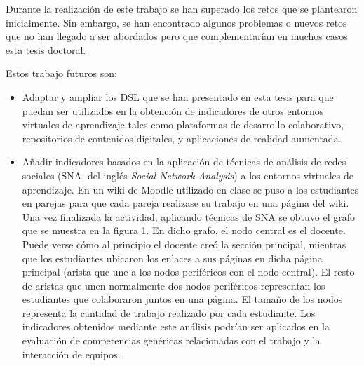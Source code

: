Durante la realización de este trabajo se han superado los retos que se plantearon inicialmente. Sin embargo, se han encontrado algunos problemas o nuevos retos que no han llegado a ser abordados pero que complementarían en muchos casos esta tesis doctoral.

Estos trabajo futuros son:
\begin{itemize}
\item Adaptar y ampliar los DSL que se han presentado en esta tesis para que puedan ser utilizados en la obtención de indicadores de otros entornos virtuales de aprendizaje tales como plataformas de desarrollo colaborativo, repositorios de contenidos digitales, y aplicaciones de realidad aumentada.
\item Añadir indicadores basados en la aplicación de técnicas de análisis de redes sociales (SNA, del inglés \emph{Social Network Analysis}) a los entornos virtuales de aprendizaje. En un wiki de Moodle utilizado en clase se puso a los estudiantes en parejas para que cada pareja realizase su trabajo en una página del wiki. Una vez finalizada la actividad, aplicando técnicas de SNA se obtuvo el grafo que se muestra en la figura 1. En dicho grafo, el nodo central es el docente. Puede verse cómo al principio el docente creó la sección principal, mientras que los estudiantes ubicaron los enlaces a sus páginas en dicha página principal (arista que une a los nodos periféricos con el nodo central). El resto de aristas que unen normalmente dos nodos periféricos representan los estudiantes que colaboraron juntos en una página. El tamaño de los nodos representa la cantidad de trabajo realizado por cada estudiante. Los indicadores obtenidos mediante este análisis podrían ser aplicados en la evaluación de competencias genéricas relacionadas con el trabajo y la interacción de equipos.
\end{itemize}


